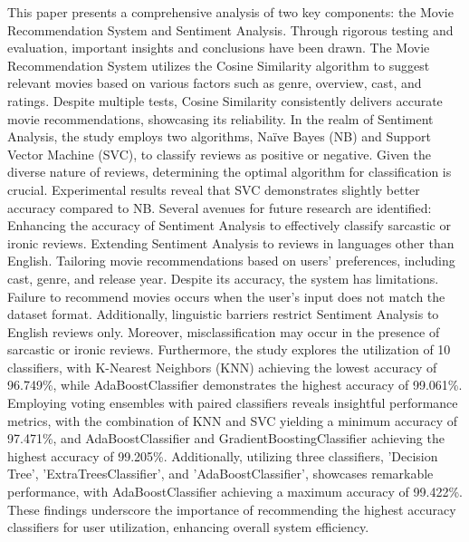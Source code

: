 \documentclass[
]{article}
\begin{document}
{{{}{This paper presents a comprehensive analysis of two key components: the Movie Recommendation System and Sentiment Analysis. Through rigorous testing and evaluation, important insights and conclusions have been drawn. The Movie Recommendation System utilizes the Cosine Similarity algorithm to suggest relevant movies based on various factors such as genre, overview, cast, and ratings. Despite multiple tests, Cosine Similarity consistently delivers accurate movie recommendations, showcasing its reliability. In the realm of Sentiment Analysis, the study employs two algorithms, Naïve Bayes (NB) and Support Vector Machine (SVC), to classify reviews as positive or negative. Given the diverse nature of reviews, determining the optimal algorithm for classification is crucial. Experimental results reveal that SVC demonstrates slightly better accuracy compared to NB. Several avenues for future research are identified: Enhancing the accuracy of Sentiment Analysis to effectively classify sarcastic or ironic reviews. Extending Sentiment Analysis to reviews in languages other than English. Tailoring movie recommendations based on users' preferences, including cast, genre, and release year. Despite its accuracy, the system has limitations. Failure to recommend movies occurs when the user's input does not match the dataset format. Additionally, linguistic barriers restrict Sentiment Analysis to English reviews only. Moreover, misclassification may occur in the presence of sarcastic or ironic reviews. Furthermore, the study explores the utilization of 10 classifiers, with K-Nearest Neighbors (KNN) achieving the lowest accuracy of 96.749\%, while AdaBoostClassifier demonstrates the highest accuracy of 99.061\%. Employing voting ensembles with paired classifiers reveals insightful performance metrics, with the combination of KNN and SVC yielding a minimum accuracy of 97.471\%, and AdaBoostClassifier and GradientBoostingClassifier achieving the highest accuracy of 99.205\%. Additionally, utilizing three classifiers, 'Decision Tree', 'ExtraTreesClassifier', and 'AdaBoostClassifier', showcases remarkable performance, with AdaBoostClassifier achieving a maximum accuracy of 99.422\%. These findings underscore the importance of recommending the highest accuracy classifiers for user utilization, enhancing overall system efficiency. }}}
\end{document}
